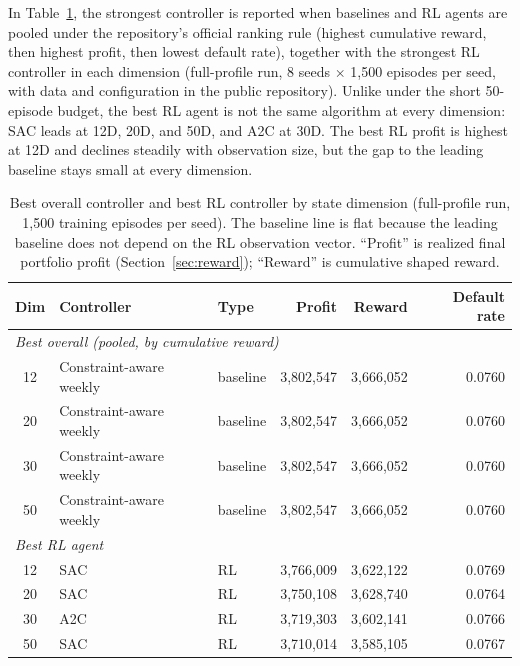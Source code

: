 \documentclass[preprint,review,authoryear,12pt]{elsarticle}
\begin{document}
In Table~\ref{tab:best-by-dim}, the strongest controller is reported when baselines and
RL agents are pooled under the repository's official ranking rule (highest cumulative
reward, then highest profit, then lowest default rate), together with the strongest RL
controller in each dimension (full-profile run, 8 seeds $\times$ 1{,}500 episodes per
seed, with data and configuration in the public repository). Unlike under the short
50-episode budget, the best RL agent is not the same algorithm at every dimension: SAC
leads at 12D, 20D, and 50D, and A2C at 30D. The best RL profit is highest at 12D and
declines steadily with observation size, but the gap to the leading baseline stays small
at every dimension.

\begin{table}[t]
    \centering
    \small
    \caption{Best overall controller and best RL controller by state dimension
        (full-profile run, 1{,}500 training episodes per seed). The baseline line is flat
        because the leading baseline does not depend on the RL observation vector. ``Profit''
        is realized final portfolio profit (Section~\ref{sec:reward}); ``Reward'' is
        cumulative shaped reward.}
    \label{tab:best-by-dim}
    \setlength{\tabcolsep}{4pt}
    \begin{tabular}{c l l r r r}
        \toprule
        Dim & Controller              & Type     & Profit        & Reward        & Default rate \\
        \midrule
        \multicolumn{6}{l}{\textit{Best overall (pooled, by cumulative reward)}}                \\
        12  & Constraint-aware weekly & baseline & 3{,}802{,}547 & 3{,}666{,}052 & 0.0760       \\
        20  & Constraint-aware weekly & baseline & 3{,}802{,}547 & 3{,}666{,}052 & 0.0760       \\
        30  & Constraint-aware weekly & baseline & 3{,}802{,}547 & 3{,}666{,}052 & 0.0760       \\
        50  & Constraint-aware weekly & baseline & 3{,}802{,}547 & 3{,}666{,}052 & 0.0760       \\
        \midrule
        \multicolumn{6}{l}{\textit{Best RL agent}}                                              \\
        12  & SAC                     & RL       & 3{,}766{,}009 & 3{,}622{,}122 & 0.0769       \\
        20  & SAC                     & RL       & 3{,}750{,}108 & 3{,}628{,}740 & 0.0764       \\
        30  & A2C                     & RL       & 3{,}719{,}303 & 3{,}602{,}141 & 0.0766       \\
        50  & SAC                     & RL       & 3{,}710{,}014 & 3{,}585{,}105 & 0.0767       \\
        \bottomrule
    \end{tabular}
\end{table}
\end{document}

